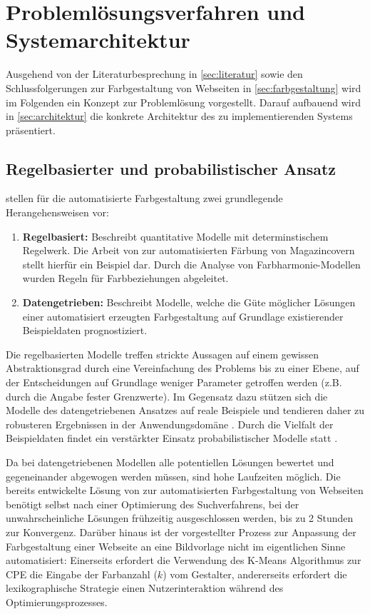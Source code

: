 \section{Problemlösungsverfahren und Systemarchitektur}
\label{sec:architecture}

Ausgehend von der Literaturbesprechung in \autoref{sec:literatur} sowie den Schlussfolgerungen zur Farbgestaltung von Webseiten in \autoref{sec:farbgestaltung} wird im Folgenden ein Konzept zur Problemlösung vorgestellt. Darauf aufbauend wird in \autoref{sec:architektur} die konkrete Architektur des zu implementierenden Systems präsentiert.

\subsection{Regelbasierter und probabilistischer Ansatz}
\label{sec:ansatz}

\citet{webpage} stellen für die automatisierte Farbgestaltung zwei grundlegende Herangehensweisen vor:

\begin{enumerate}
	\item \textbf{Regelbasiert:} Beschreibt quantitative Modelle mit determinstischem Regelwerk. Die Arbeit von \citet{magazines} zur automatisierten Färbung von Magazincovern stellt hierfür ein Beispiel dar. Durch die Analyse von Farbharmonie-Modellen wurden Regeln für Farbbeziehungen abgeleitet.
	\item \textbf{Datengetrieben:} Beschreibt Modelle, welche die Güte möglicher Lösungen einer automatisiert erzeugten Farbgestaltung auf Grundlage existierender Beispieldaten prognostiziert.
\end{enumerate}

Die regelbasierten Modelle treffen strickte Aussagen auf einem gewissen Abstraktionsgrad durch eine Vereinfachung des Problems bis zu einer Ebene, auf der Entscheidungen auf Grundlage weniger Parameter getroffen werden (z.B. durch die Angabe fester Grenzwerte). Im Gegensatz dazu stützen sich die Modelle des datengetriebenen Ansatzes auf reale Beispiele und tendieren daher zu robusteren Ergebnissen in der Anwendungsdomäne \citep{webpage}. Durch die Vielfalt der Beispieldaten findet ein verstärkter Einsatz probabilistischer Modelle statt \citep[siehe z.B.][]{webpage, patterns}.

Da bei datengetriebenen Modellen alle potentiellen Lösungen bewertet und gegeneinander abgewogen werden müssen, sind hohe Laufzeiten möglich. Die bereits entwickelte Lösung von \citet{webpage} zur automatisierten Farbgestaltung von Webseiten benötigt selbst nach einer Optimierung des Suchverfahrens, bei der unwahrscheinliche Lösungen frühzeitig ausgeschlossen werden, bis zu 2 Stunden zur Konvergenz. Darüber hinaus ist der vorgestellter Prozess zur Anpassung der Farbgestaltung einer Webseite an eine Bildvorlage nicht im eigentlichen Sinne automatisiert: Einerseits erfordert die Verwendung des K-Means Algorithmus zur CPE die Eingabe der Farbanzahl ($k$) vom Gestalter, andererseits erfordert die lexikographische Strategie einen Nutzerinteraktion während des Optimierungsprozesses.

